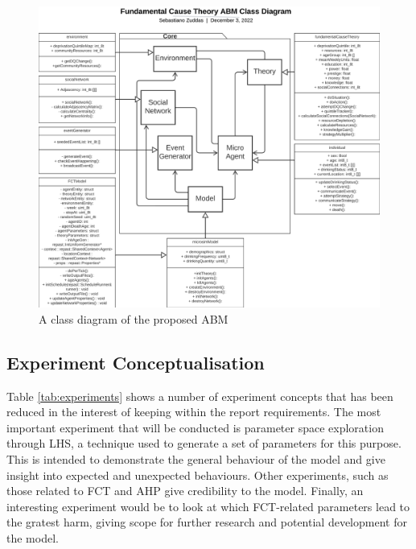 \begin{figure}[h]
\centering
\includegraphics[width=\linewidth]{figures/Class Diagram FYP December.png}
\caption{A class diagram of the proposed ABM}
\label{fig:fctUML}
\end{figure}




\subsection{Experiment Conceptualisation}

Table \ref{tab:experiments} shows a number of experiment concepts that has been reduced in the interest of keeping within the report requirements. The most important experiment that will be conducted is parameter space exploration through \ac{LHS}, a technique used to generate a set of parameters for this purpose. This is intended to demonstrate the general behaviour of the model and give insight into expected and unexpected behaviours. Other experiments, such as those related to \ac{FCT} and \ac{AHP} give credibility to the model. Finally, an interesting experiment would be to look at which \ac{FCT}-related parameters lead to the gratest harm, giving scope for further research and potential development for the model.  

